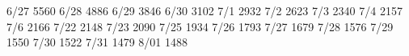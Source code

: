 6/27	5560
6/28	4886
6/29	3846
6/30	3102
7/1	2932
7/2	2623
7/3	2340
7/4  2157
7/6  2166
7/22 2148
7/23 2090
7/25 1934
7/26 1793
7/27 1679
7/28 1576
7/29 1550
7/30 1522
7/31 1479
8/01 1488